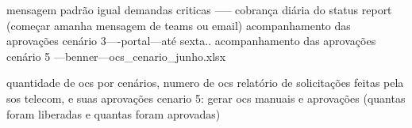 mensagem padrão igual demandas criticas ----- cobrança diária do status report (começar amanha mensagem de teams ou email)
acompanhamento das aprovações cenário 3----portal---até sexta..
acompanhamento das aprovações cenário 5 ---benner---ocs_cenario_junho.xlsx

quantidade de ocs por cenários,
numero de ocs
relatório de solicitações feitas pela sos telecom, e suas aprovações
cenario 5: gerar ocs manuais e aprovações (quantas foram liberadas e quantas foram aprovadas)